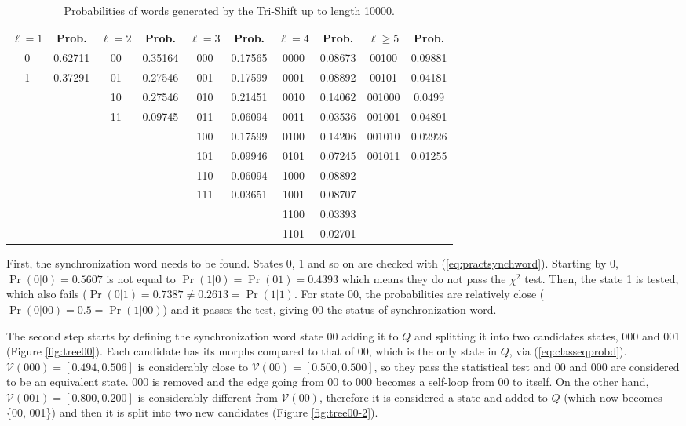 {\begin{table}
\centering
\caption{Probabilities of words generated by the Tri-Shift up to length 10000. \label{tab:trishiftsub}}
\begin{tabular}{|c|c|c|c|c|c|c|c|c|c|}
\hline
$\ell = 1$ & Prob. & $\ell = 2$ & Prob. & $\ell = 3$ & Prob. & $\ell = 4$ & Prob. & $\ell \geq 5$ & Prob.\\
\hline
0 & 0.62711 & 00 & 0.35164 & 000 & 0.17565 & 0000 & 0.08673 & 00100 & 0.09881\\
1 & 0.37291 & 01 & 0.27546 & 001 & 0.17599 & 0001 & 0.08892 & 00101 & 0.04181\\
  &      & 10 & 0.27546 & 010 & 0.21451 & 0010 & 0.14062 & 001000 & 0.0499\\
  &      & 11 & 0.09745 & 011 & 0.06094 & 0011 & 0.03536 & 001001 & 0.04891\\
  &	     &    &      & 100 & 0.17599 & 0100 & 0.14206 & 001010 & 0.02926\\
  &      &    &      & 101 & 0.09946 & 0101 & 0.07245 & 001011 & 0.01255\\
  &      &    &      & 110 & 0.06094 & 1000 & 0.08892 &        &     \\
  &      &    &      & 111 & 0.03651 & 1001 & 0.08707 &        &     \\
  &      &    &      &     &      & 1100 & 0.03393 &        &     \\
  &      &    &      &     &      & 1101 & 0.02701 &        &     \\
\hline
\end{tabular}
\end{table}

First, the synchronization word needs to be found. States 0, 1 and so on are checked with (\ref{eq:practsynchword}). Starting by 0, $\Pr(0|0) = 0.5607$ is not equal to $\Pr(1|0) = \Pr(01)= 0.4393$ which means they do not pass the $\chi^2$ test. Then, the state 1 is tested, which also fails ($\Pr(0|1) = 0.7387 \neq 0.2613 = \Pr(1|1)$. For state 00, the probabilities are relatively close ($\Pr(0|00) = 0.5 = \Pr(1|00)$) and it passes the test, giving 00 the status of synchronization word.

The second step starts by defining the synchronization word state 00 adding it to $Q$ and splitting it into two candidates states, 000 and 001 (Figure \ref{fig:tree00}). Each candidate has its morphs compared to that of 00, which is the only state in $Q$, via (\ref{eq:classeqprobd}). $\mathcal{V}(000) = [0.494, 0.506]$ is considerably close to $\mathcal{V}(00) = [0.500, 0.500]$, so they pass the statistical test and 00 and 000 are considered to be an equivalent state. 000 is removed and the edge going from 00 to 000 becomes a self-loop from 00 to itself. On the other hand, $\mathcal{V}(001) = [0.800, 0.200]$ is considerably different from $\mathcal{V}(00)$, therefore it is considered a state and added to $Q$ (which now becomes \{00, 001\}) and then it is split into two new candidates (Figure \ref{fig:tree00-2}).

}
